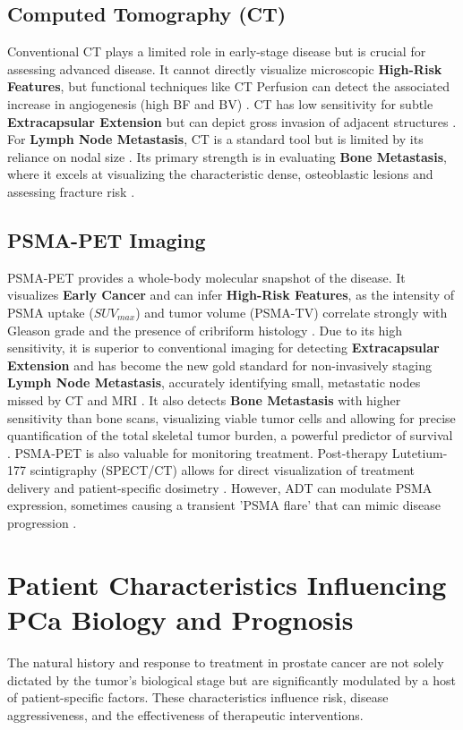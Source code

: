 \documentclass[11pt, a4paper]{article}
\begin{document}
\subsection{Computed Tomography (CT)}
Conventional CT plays a limited role in early-stage disease but is crucial for assessing advanced disease. It cannot directly visualize microscopic \textbf{High-Risk Features}, but functional techniques like CT Perfusion can detect the associated increase in angiogenesis (high BF and BV) \cite{HuellnerPauli2014}. CT has low sensitivity for subtle \textbf{Extracapsular Extension} but can depict gross invasion of adjacent structures \cite{OliveiraFerreira2023}. For \textbf{Lymph Node Metastasis}, CT is a standard tool but is limited by its reliance on nodal size \cite{ZarzourGalgano2017}. Its primary strength is in evaluating \textbf{Bone Metastasis}, where it excels at visualizing the characteristic dense, osteoblastic lesions and assessing fracture risk \cite{HayakawaTabata2020}.

\subsection{PSMA-PET Imaging}
PSMA-PET provides a whole-body molecular snapshot of the disease. It visualizes \textbf{Early Cancer} and can infer \textbf{High-Risk Features}, as the intensity of PSMA uptake ($SUV_{max}$) and tumor volume (PSMA-TV) correlate strongly with Gleason grade and the presence of cribriform histology \cite{ZouJiao2020, VetroneMei2023}. Due to its high sensitivity, it is superior to conventional imaging for detecting \textbf{Extracapsular Extension} and has become the new gold standard for non-invasively staging \textbf{Lymph Node Metastasis}, accurately identifying small, metastatic nodes missed by CT and MRI \cite{VetroneMei2023, SiegelMiller2018}. It also detects \textbf{Bone Metastasis} with higher sensitivity than bone scans, visualizing viable tumor cells and allowing for precise quantification of the total skeletal tumor burden, a powerful predictor of survival \cite{KleiburgGeusOei2025}. PSMA-PET is also valuable for monitoring treatment. Post-therapy Lutetium-177 scintigraphy (SPECT/CT) allows for direct visualization of treatment delivery and patient-specific dosimetry \cite{HennrichEder2022, PathmanandavelCrumbaker2022}. However, ADT can modulate PSMA expression, sometimes causing a transient 'PSMA flare' that can mimic disease progression \cite{AmalachandranSivathapandi2024, MohseniniaZamaniSiahkali2024}.

\section{Patient Characteristics Influencing PCa Biology and Prognosis}
The natural history and response to treatment in prostate cancer are not solely dictated by the tumor's biological stage but are significantly modulated by a host of patient-specific factors. These characteristics influence risk, disease aggressiveness, and the effectiveness of therapeutic interventions.
\end{document}

